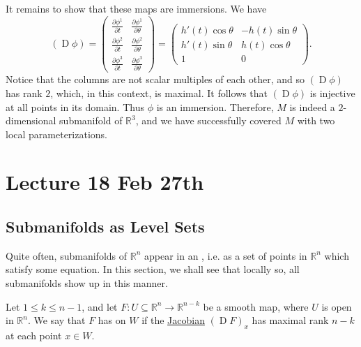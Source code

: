 \documentclass[notoc,notitlepage]{tufte-book}
\DeclareMathOperator{\D}{D}
\begin{document}
It remains to show that these maps are immersions. We have
\begin{equation*}
  (\D \phi) = \begin{pmatrix}
    \frac{\partial \phi^1}{\partial t} & \frac{\partial \phi^1}{\partial \theta}
    \\
    \frac{\partial \phi^2}{\partial t} & \frac{\partial \phi^2}{\partial \theta}
    \\
    \frac{\partial \phi^3}{\partial t} & \frac{\partial \phi^3}{\partial \theta}
  \end{pmatrix} = \begin{pmatrix}
    h'(t) \cos \theta & - h(t) \sin \theta \\
    h'(t) \sin \theta & h(t) \cos \theta \\
    1                 & 0
  \end{pmatrix}.
\end{equation*}
Notice that the columns are not scalar multiples of each other, and so $(\D
\phi)$ has rank $2$, which, in this context, is maximal. It follows that $(\D
\phi)$ is injective at all points in its domain. Thus $\phi$ is an immersion.
Therefore, $M$ is indeed a $2$-dimensional submanifold of $\mathbb{R}^3$, and we
have successfully covered $M$ with two local parameterizations.



\chapter{Lecture 18 Feb 27th}%
\label{chp:lecture_18_feb_27th}

\section{Submanifolds as Level Sets}%
\label{sec:submanifolds_as_level_sets}

Quite often, submanifolds of $\mathbb{R}^n$ appear in an ,
i.e. as a set of points in $\mathbb{R}^n$ which satisfy some equation. In this
section, we shall see that locally so, all submanifolds show up in this manner.

\begin{defn}\label{defn:maximal_rank}
  Let $1 \leq k \leq n - 1$, and let $F : U \subseteq \mathbb{R}^n \to
  \mathbb{R}^{n - k}$ be a smooth map, where $U$ is open in $\mathbb{R}^n$. We
  say that $F$ has  on $W$ if the
  \hyperref[defn:differential]{Jacobian} $(\D F)_{x}$ has maximal rank $n - k$
  at each point $x \in W$.
\end{defn}
\end{document}
